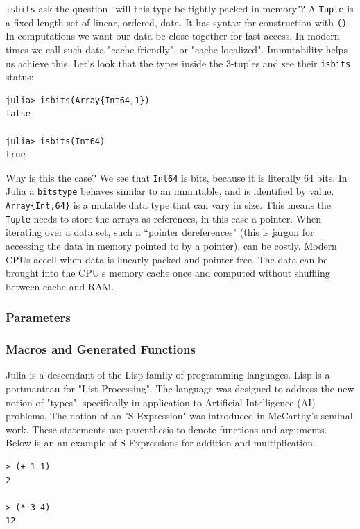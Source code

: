 \documentclass[a4paper]{article}
\begin{document}
\texttt{isbits} ask the question ``will this type be tightly packed in memory"? A
\texttt{Tuple} is a fixed-length set of linear, ordered, data. It has syntax for
construction with \texttt{()}. In computations we want our data be close together
for fast access. In modern times we call such data "cache friendly", or
"cache localized". Immutability helps us achieve this. Let's look that the
types inside the 3-tuples and see their \texttt{isbits} status:
\begin{lstlisting}
julia> isbits(Array{Int64,1})
false

julia> isbits(Int64)
true
\end{lstlisting}
Why is this the case? We see that \texttt{Int64} is bits, because it is literally
64 bits. In Julia a \texttt{bitstype} behaves similar to an immutable, and is identified
by value. \texttt{Array\{Int,64\}} is a mutable data type that can vary in size.
This means
the \texttt{Tuple} needs to store the arrays as references, in this case a
pointer. When iterating over a data set, such a ``pointer dereferences" (this is
jargon for accessing the data in memory pointed to by a pointer), can be costly.
Modern CPUs accell when data is linearly packed and pointer-free. The
data can be brought into the CPU's memory cache once and computed without
shuffling between cache and RAM.

\subsubsection{Parameters}


\subsubsection{Macros and Generated Functions}
Julia is a descendant of the Lisp family of programming languages. Lisp
is a portmanteau for "List Processing". The language was designed to address
the new notion of "types", specifically in application to Artificial
Intelligence (AI) problems.\cite{McCarthy_1966} The notion of an "S-Expression"
was introduced in McCarthy's seminal work. These statements use parenthesis
to denote functions and arguments. Below is an an example of S-Expressions
for addition and multiplication.

\begin{lstlisting}
> (+ 1 1)
2

> (* 3 4)
12
\end{lstlisting}
\end{document}
